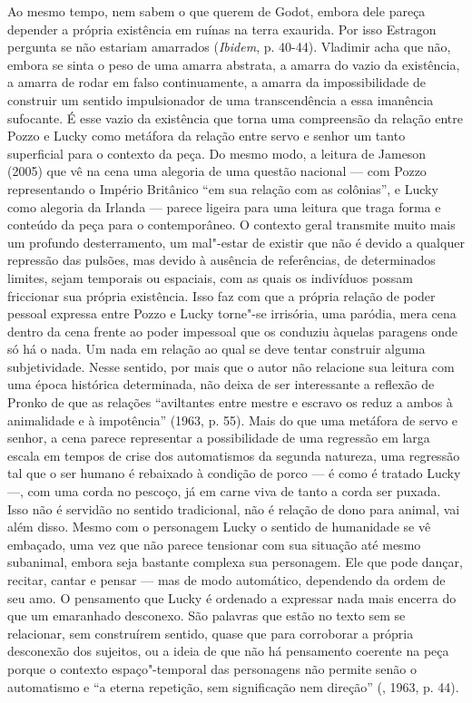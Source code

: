 Ao mesmo tempo, nem sabem o que querem de Godot, embora dele pareça
depender a própria existência em ruínas na terra exaurida. Por isso
Estragon pergunta se não estariam amarrados (\emph{Ibidem}, p. 40-44).
Vladimir acha que não, embora se sinta o peso de uma amarra abstrata, a
amarra do vazio da existência, a amarra de rodar em falso continuamente,
a amarra da impossibilidade de construir um sentido impulsionador de uma
transcendência a essa imanência sufocante. É esse vazio da existência
que torna uma compreensão da relação entre Pozzo e Lucky como metáfora
da relação entre servo e senhor um tanto superficial para o contexto da
peça. Do mesmo modo, a leitura de Jameson (2005) que vê na cena uma
alegoria de uma questão nacional --- com Pozzo representando o Império
Britânico ``em sua relação com as colônias'', e Lucky como alegoria da
Irlanda --- parece ligeira para uma leitura que traga forma e conteúdo da
peça para o contemporâneo. O contexto geral transmite muito mais um
profundo desterramento, um mal"-estar de existir que não é devido a
qualquer repressão das pulsões, mas devido à ausência de referências, de
determinados limites, sejam temporais ou espaciais, com as quais os
indivíduos possam friccionar sua própria existência. Isso faz com que a
própria relação de poder pessoal expressa entre Pozzo e Lucky torne"-se
irrisória, uma paródia, mera cena dentro da cena frente ao poder
impessoal que os conduziu àquelas paragens onde só há o nada. Um nada em
relação ao qual se deve tentar construir alguma subjetividade. Nesse
sentido, por mais que o autor não relacione sua leitura com uma época
histórica determinada, não deixa de ser interessante a reflexão de
Pronko de que as relações ``aviltantes entre mestre e escravo os reduz a
ambos à animalidade e à impotência'' (1963, p. 55). Mais do que uma
metáfora de servo e senhor, a cena parece representar a possibilidade de
uma regressão em larga escala em tempos de crise dos automatismos da
segunda natureza, uma regressão tal que o ser humano é rebaixado à
condição de porco --- é como é tratado Lucky ---, com uma corda no
pescoço, já em carne viva de tanto a corda ser puxada. Isso não é
servidão no sentido tradicional, não é relação de dono para animal, vai
além disso. Mesmo com o personagem Lucky o sentido de humanidade se vê
embaçado, uma vez que não parece tensionar com sua situação até mesmo
subanimal, embora seja bastante complexa sua personagem. Ele que pode
dançar, recitar, cantar e pensar --- mas de modo automático, dependendo
da ordem de seu amo. O pensamento que Lucky é ordenado a expressar nada
mais encerra do que um emaranhado desconexo. São palavras que estão no
texto sem se relacionar, sem construírem sentido, quase que para
corroborar a própria desconexão dos sujeitos, ou a ideia de que não há
pensamento coerente na peça porque o contexto espaço"-temporal das
personagens não permite senão o automatismo e ``a eterna repetição, sem
significação nem direção'' (, 1963, p. 44).

